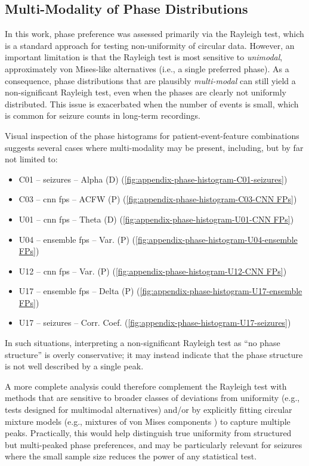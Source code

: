 \subsection{Multi-Modality of Phase Distributions}
In this work, phase preference was assessed primarily via the Rayleigh test, which is a standard approach for testing non-uniformity of circular data.
However, an important limitation is that the Rayleigh test is most sensitive to \emph{unimodal}, approximately von Mises-like alternatives (i.e., a single preferred phase).
As a consequence, phase distributions that are plausibly \emph{multi-modal} can still yield a non-significant Rayleigh test, even when the phases are clearly not uniformly distributed.
This issue is exacerbated when the number of events is small, which is common for seizure counts in long-term recordings.

Visual inspection of the phase histograms for patient-event-feature combinations suggests several cases where multi-modality may be present, including, but by far not limited to:
\begin{itemize}
    \item C01 -- seizures -- Alpha (D) (\cref{fig:appendix-phase-histogram-C01-seizures})
    \item C03 -- \gls{cnn} \glspl{fp} -- ACFW (P) (\cref{fig:appendix-phase-histogram-C03-CNN FPs})
    \item U01 -- \gls{cnn} \glspl{fp} -- Theta (D) (\cref{fig:appendix-phase-histogram-U01-CNN FPs})
    \item U04 -- ensemble \glspl{fp} -- Var.
    (P) (\cref{fig:appendix-phase-histogram-U04-ensemble FPs})
    \item U12 -- \gls{cnn} \glspl{fp} -- Var.
    (P) (\cref{fig:appendix-phase-histogram-U12-CNN FPs})
    \item U17 -- ensemble \glspl{fp} -- Delta (P) (\cref{fig:appendix-phase-histogram-U17-ensemble FPs})
    \item U17 -- seizures -- Corr.
    Coef.
    (\cref{fig:appendix-phase-histogram-U17-seizures})
\end{itemize}
In such situations, interpreting a non-significant Rayleigh test as ``no phase structure'' is overly conservative; it may instead indicate that the phase structure is not well described by a single peak.

A more complete analysis could therefore complement the Rayleigh test with methods that are sensitive to broader classes of deviations from uniformity (e.g., tests designed for multimodal alternatives) and/or by explicitly fitting circular mixture models (e.g., mixtures of von Mises components \parencite{costa_circular_2026}) to capture multiple peaks.
Practically, this would help distinguish true uniformity from structured but multi-peaked phase preferences, and may be particularly relevant for seizures where the small sample size reduces the power of any statistical test.


